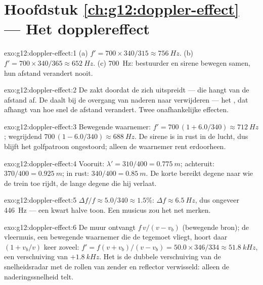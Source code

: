 \section*{Hoofdstuk \ref{ch:g12:doppler-effect} --- Het dopplereffect}

\begin{solution}{exo:g12:doppler-effect:1}
(a) $f' = 700 \times 340/315 \approx \qty{756}{Hz}$.
(b) $f' = 700 \times 340/365 \approx \qty{652}{Hz}$.
(c) \qty{700}{Hz}: bestuurder en sirene bewegen samen, hun afstand
verandert nooit.
\end{solution}

\begin{solution}{exo:g12:doppler-effect:2}
De \emph{} zakt doordat de  zich uitspreidt --- die hangt van
de afstand af. De \emph{} daalt bij de overgang van naderen naar
verwijderen --- het , dat afhangt van hoe snel de afstand
verandert. Twee onafhankelijke effecten.
\end{solution}

\begin{solution}{exo:g12:doppler-effect:3}
Bewegende waarnemer: $f' = 700\,(1 + 6.0/340) \approx \qty{712}{Hz}$;
wegrijdend $700\,(1 - 6.0/340) \approx \qty{688}{Hz}$. De sirene is in
rust in de lucht, dus blijft het golfpatroon ongestoord; alleen de
waarnemer rent erdoorheen.
\end{solution}

\begin{solution}{exo:g12:doppler-effect:4}
Vooruit: $\lambda' = 310/400 = \qty{0.775}{m}$; achteruit:
$370/400 = \qty{0.925}{m}$; in rust: $340/400 = \qty{0.85}{m}$. De korte
 bereikt degene naar wie de trein toe rijdt, de lange degene die
hij verlaat.
\end{solution}

\begin{solution}{exo:g12:doppler-effect:5}
$\Delta f/f \approx 5.0/340 \approx 1.5\%$: $\Delta f \approx
\qty{6.5}{Hz}$, dus ongeveer \qty{446}{Hz} --- een kwart halve toon. Een
musicus zou het net merken.
\end{solution}

\begin{solution}{exo:g12:doppler-effect:6}
De muur ontvangt $f\,v/(v - v_b)$ (bewegende bron); de vleermuis, een
bewegende waarnemer die de  tegemoet vliegt, hoort daar $(1 + v_b/v)$
keer zoveel: $f' = f(v + v_b)/(v - v_b) = 50.0 \times 346/334 \approx
\qty{51.8}{kHz}$, een verschuiving van $+\qty{1.8}{kHz}$. Het is de
dubbele verschuiving van de snelheidsradar met de rollen van zender en
reflector verwisseld: alleen de naderingssnelheid telt.
\end{solution}

